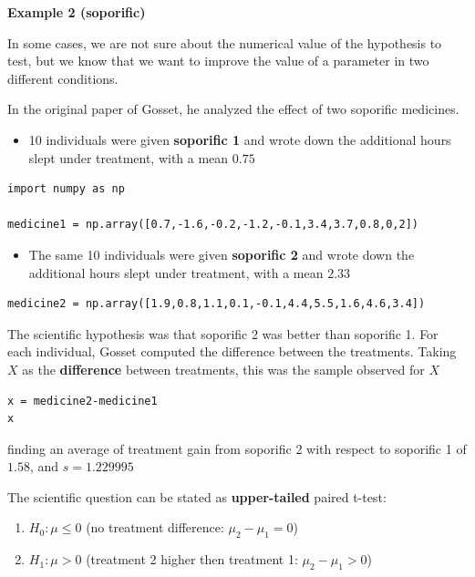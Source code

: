 \documentclass[
]{book}
\providecommand{\tightlist}{%
  \setlength{\itemsep}{0pt}\setlength{\parskip}{0pt}}
\begin{document}
\textbf{Example 2 (soporific)}

In some cases, we are not sure about the numerical value of the hypothesis to test, but we know that we want to improve the value of a parameter in two different conditions.

In the original paper of Gosset, he analyzed the effect of two soporific medicines.

\begin{itemize}
\tightlist
\item
  10 individuals were given \textbf{soporific 1} and wrote down the additional hours slept under treatment, with a mean \(0.75\)
\end{itemize}

\begin{verbatim}
import numpy as np

medicine1 = np.array([0.7,-1.6,-0.2,-1.2,-0.1,3.4,3.7,0.8,0,2])
\end{verbatim}

\begin{itemize}
\tightlist
\item
  The same 10 individuals were given \textbf{soporific 2} and wrote down the additional hours slept under treatment, with a mean \(2.33\)
\end{itemize}

\begin{verbatim}
medicine2 = np.array([1.9,0.8,1.1,0.1,-0.1,4.4,5.5,1.6,4.6,3.4])
\end{verbatim}

The scientific hypothesis was that soporific 2 was better than soporific 1. For each individual, Gosset computed the difference between the treatments. Taking \(X\) as the \textbf{difference} between treatments, this was the sample observed for \(X\)

\begin{verbatim}
x = medicine2-medicine1
x
\end{verbatim}

finding an average of treatment gain from soporific 2 with respect to soporific 1 of \(1.58\), and \(s=1.229995\)

The scientific question can be stated as \textbf{upper-tailed} paired t-test:

\begin{enumerate}
\def\labelenumi{\alph{enumi}.}
\tightlist
\item
  \(H_0:\mu \leq 0\) (no treatment difference: \(\mu_2-\mu_1=0\))
\item
  \(H_1:\mu > 0\) (treatment 2 higher then treatment 1: \(\mu_2-\mu_1>0\))
\end{enumerate}
\end{document}
